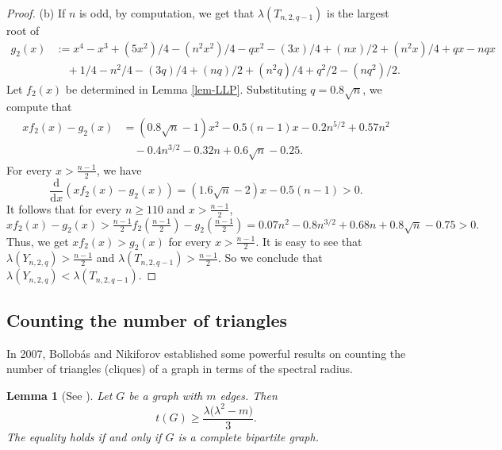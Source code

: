 \documentclass[11pt]{article}
\newtheorem{lemma}[theorem]{Lemma}
\begin{document}
\begin{proof}
\medskip 
(b) If $n$ is odd, by computation, we get that $\lambda (T_{n,2,q-1})$ is the largest root of 
\begin{equation*}
\begin{aligned}
g_2(x) &:= x^4- x^3+ (5 x^2)/4 - (n^2 x^2)/4 - q x^2 - (
 3 x)/4 + (n x)/2 + (n^2 x)/4 + q x - n q x \\ 
& \quad  +1/4 - n^2/4 - (3 q)/4 + (n q)/2 + (n^2 q)/4 + q^2/2 - (n q^2)/2  .
\end{aligned}
\end{equation*}
Let $f_2(x)$ be determined in Lemma \ref{lem-LLP}. 
Substituting $q=0.8 \sqrt{n}$, we compute that 
\begin{equation*}
\begin{aligned}  
xf_2(x) -g_2(x) &= ( 0.8 \sqrt{n} -1) x^2 - 0.5(n-1) x  - 0.2 n^{5/2} + 0.57 n^2 \\ & \quad  - 0.4 n^{3/2} - 0.32 n + 0.6 \sqrt{n} -0.25 .
\end{aligned}
\end{equation*}
For every $x> \frac{n-1}{2}$, we have 
 \[ \frac{\mathrm{d}}{\mathrm{d} x} (xf_2(x) - g_2(x) ) = (1.6 \sqrt{n} -2)x - 0.5(n-1) >0. \]
 It follows that for every $n\ge 110$ and $x> \frac{n-1}{2}$, 
 \[ xf_2(x) - g_2(x) > \tfrac{n-1}{2} f_2(\tfrac{n-1}{2}) - g_2(\tfrac{n-1}{2}) 
 = 0.07 n^2 - 0.8 n^{3/2} + 0.68 n + 0.8 \sqrt{n} - 0.75 > 0. \] 
Thus, we get $xf_2(x) > g_2(x)$ for every $x> \frac{n-1}{2}$. 
It is easy to see that $\lambda (Y_{n,2,q})> \frac{n-1}{2}$ and $\lambda (T_{n,2,q-1}) > \frac{n-1}{2}$. So we conclude that $\lambda (Y_{n,2,q}) < \lambda (T_{n,2,q-1})$. 
\end{proof}



\subsection{Counting the number of triangles}

In 2007, Bollob\'{a}s and Nikiforov  \cite{BN2007jctb} 
established some powerful results on counting the number of 
triangles (cliques) of a graph 
in terms of the spectral radius. 



    
\begin{lemma}[See \cite{BN2007jctb,CFTZ20,NZ2021}] 
\label{thm-BN-CFTZ-NZ}
Let $G$ be a  graph with $m$ edges. Then 
\begin{equation*} 
  t(G) \ge \frac{\lambda \bigl(\lambda^2 - m\bigr)}{3}. 
  \end{equation*}
    The equality holds if and only if $G$ is a complete bipartite graph.  
\end{lemma}
 
\end{document}
